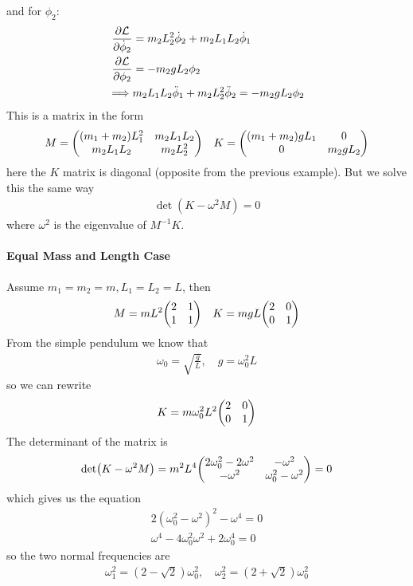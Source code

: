 \documentclass[../main.tex]{subfiles}
\begin{document}
and for $\phi_2$:
\begin{align*}
    \pdv{\mathcal{L}}{\dot\phi_2} &= m_2 L_2^2 \dot\phi_2 + m_2 L_1 L_2 \dot\phi_1 \\
    \pdv{\mathcal{L}}{\phi_2} &= - m_2 g L_2 \phi_2 \\
    \implies &m_2 L_1 L_2 \ddot\phi_1 + m_2 L_2^2 \ddot\phi_2 = - m_2 g L_2 \phi_2
\end{align*}
This is a matrix in the form
\begin{align*}
    M = \mqty((m_1 + m_2) L_1^2 & m_2 L_1 L_2 \\ m_2 L_1 L_2 & m_2 L_2^2) \quad
    K = \mqty((m_1 + m_2) g L_1 & 0 \\ 0 & m_2 g L_2)
\end{align*}
here the $K$ matrix is diagonal (opposite from the previous example). But we solve this the same way
\begin{align*}
    \det(K - \omega^2 M) = 0
\end{align*}
where $\omega^2$ is the eigenvalue of $M^{-1} K$. 
\paragraph*{Equal Mass and Length Case}
Assume $m_1 = m_2 = m, L_1 = L_2 = L$, then
\begin{align*}
    M = m L^2 \mqty(2 & 1 \\ 1 & 1) \quad K = m g L \mqty(2 & 0 \\ 0 & 1)
\end{align*}
From the simple pendulum we know that
\begin{align*}
    \omega_0 = \sqrt{\frac{g}{L}}, \quad g = \omega_0^2 L
\end{align*}
so we can rewrite
\begin{align*}
    K = m \omega_0^2 L^2 \mqty(2 & 0 \\ 0 & 1)
\end{align*}
The determinant of the matrix is
\begin{align*}
    \det(K - \omega^2 M) = m^2 L^4 \mqty(2\omega_0^2 - 2\omega^2 & - \omega^2 \\ - \omega^2 & \omega_0^2 - \omega^2) = 0
\end{align*}
which gives us the equation
\begin{align*}
    2(\omega_0^2 - \omega^2)^2 - \omega^4 = 0 \\
    \omega^4 - 4\omega_0^2 \omega^2 + 2\omega_0^4 = 0
\end{align*}
so the two normal frequencies are
\begin{align*}
    \omega_1^2 = (2 - \sqrt 2) \omega_0^2, \quad \omega_2^2 = (2 + \sqrt 2) \omega_0^2
\end{align*}
\end{document}

